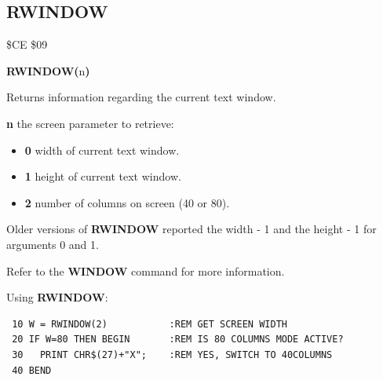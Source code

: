 
\newpage
\subsection{RWINDOW}
\begin{description}[leftmargin=2cm,style=nextline]
\item [Token:] \$CE \$09
\item [Format:] {\bf RWINDOW(}n{\bf)}
\item [Usage:]  Returns information regarding the current text window.

                {\bf n} the screen parameter to retrieve:

                \begin{itemize}
                    \item {\bf 0} width of current text window.
                    \item {\bf 1} height of current text window.
                    \item {\bf 2} number of columns on screen (40 or 80).
                \end{itemize}

\item [Remarks:] Older versions of {\bf RWINDOW} reported
                 the width - 1 and the height - 1 for arguments 0 and 1.

                 Refer to the {\bf WINDOW} command for more information.

\item [Example:] Using {\bf RWINDOW}:
\begin{tcolorbox}[colback=black,coltext=white]
\verbatimfont{\codefont}
\begin{verbatim}
 10 W = RWINDOW(2)           :REM GET SCREEN WIDTH
 20 IF W=80 THEN BEGIN       :REM IS 80 COLUMNS MODE ACTIVE?
 30   PRINT CHR$(27)+"X";    :REM YES, SWITCH TO 40COLUMNS
 40 BEND
\end{verbatim}
\end{tcolorbox}
\end{description}





\newpage
